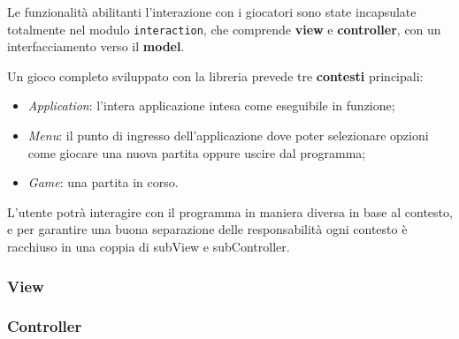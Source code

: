 Le funzionalità abilitanti l'interazione con i giocatori sono state incapsulate totalmente nel modulo \texttt{interaction}, che comprende \textbf{view} e \textbf{controller}, con un interfacciamento verso il \textbf{model}.

Un gioco completo sviluppato con la libreria prevede tre \textbf{contesti} principali:
\begin{itemize}
    \item \textit{Application}: l'intera applicazione intesa come eseguibile in funzione; %
    \item \textit{Menu}: il punto di ingresso dell'applicazione dove poter selezionare opzioni come giocare una nuova partita oppure uscire dal programma;
    \item \textit{Game}: una partita in corso.
\end{itemize}

L'utente potrà interagire con il programma in maniera diversa in base al contesto, e per garantire una buona separazione delle responsabilità ogni contesto è racchiuso in una coppia di subView e subController.

\subsubsection{View}
\subsubsection{Controller}
